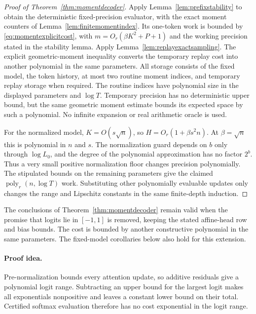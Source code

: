 \begin{proof}[Proof of Theorem~\ref{thm:momentdecoder}]
Apply Lemma~\ref{lem:prefixstability} to obtain the deterministic
fixed-precision evaluator, with the exact moment counters of
Lemma~\ref{lem:finitemomentindex}.  Its one-token work is bounded
by \eqref{eq:momentexplicitcost}, with
$m=O_r(\beta K^2+P+1)$ and the working precision stated in the
stability lemma.  Apply Lemma~\ref{lem:replayexactsampling}.
The explicit geometric-moment inequality converts the temporary
replay cost into another polynomial in the same parameters.
All storage consists of the fixed model, the token history, at
most two routine moment indices, and temporary replay storage
when required.  The routine indices have polynomial size in the
displayed parameters and $\log T$.  Temporary precision has no
deterministic upper bound, but the same geometric moment estimate
bounds its expected space by such a polynomial.  No infinite
expansion or real arithmetic oracle is used.

For the normalized model, $K=O(s\sqrt n)$, so
$H=O_r(1+\beta s^2n)$.  At $\beta=\sqrt n$ this is polynomial
in $n$ and $s$.  The normalization guard depends on $b$ only
through $\log L_0$, and the degree of the polynomial approximation
has no factor $2^b$.  Thus a very small
positive normalization floor changes precision polynomially.
The stipulated bounds on the remaining parameters give the
claimed $\operatorname{poly}_r(n,\log T)$ work.  Substituting
other polynomially evaluable updates only changes the range and
Lipschitz constants in the same finite-depth induction.
\end{proof}

\begin{corollary}
\label{cor:affineheadmoment}
The conclusions of Theorem~\ref{thm:momentdecoder} remain valid
when the promise that logits lie in $[-1,1]$ is removed, keeping
the stated affine-head row and bias bounds.  The cost is bounded
by another constructive polynomial in the same parameters.
The fixed-model corollaries below also hold for this extension.
\end{corollary}

\paragraph{Proof idea.}
Pre-normalization bounds every attention update, so additive
residuals give a polynomial logit range.  Subtracting an upper
bound for the largest logit makes all exponentials nonpositive
and leaves a constant lower bound on their total.  Certified
softmax evaluation therefore has no cost exponential in the
logit range.

